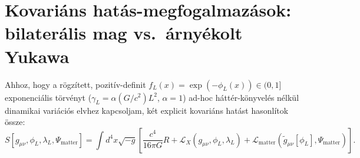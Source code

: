 \documentclass[10pt,a4paper]{article}
\begin{document}
\section{Kovariáns hatás-megfogalmazások: bilaterális mag vs.\ árnyékolt Yukawa}
Ahhoz, hogy a rögzített, pozitív-definit $f_L(x) = \exp(-\phi_L(x)) \in (0,1]$ exponenciális törvényt ($\gamma_L = \alpha (G/c^2)L^2$, $\alpha=1$) ad-hoc háttér-könyvelés nélkül dinamikai variációs elvhez kapcsoljam, két explicit kovariáns hatást hasonlítok össze:
\begin{equation}
  S[g_{\mu\nu}, \phi_L, \lambda_L, \Psi_{\text{matter}}] = \int d^4x\sqrt{-g}\left[\frac{c^4}{16\pi G}R + \mathcal{L}_X(g_{\mu\nu}, \phi_L, \lambda_L) + \mathcal{L}_{\text{matter}}\!\left(\tilde{g}_{\mu\nu}[\phi_L], \Psi_{\text{matter}}\right)\right].
\end{equation}
\end{document}
